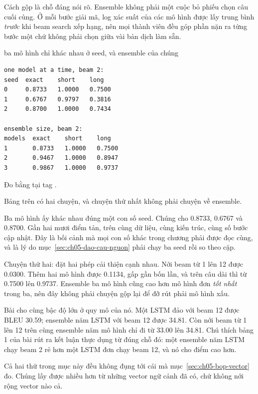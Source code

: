 Cách gộp là chỗ đáng nói rõ. Ensemble không phải một cuộc bỏ phiếu chọn câu cuối
cùng. Ở mỗi bước giải mã, log xác suất của các mô hình được lấy trung bình
\emph{trước} khi beam search xếp hạng, nên mọi thành viên đều góp phần nặn ra
từng bước một chứ không phải chọn giữa vài bản dịch làm sẵn.

\begin{measured}{ba mô hình chỉ khác nhau ở seed, và ensemble của chúng}
\begin{verbatim}
one model at a time, beam 2:
seed  exact    short    long
0     0.8733   1.0000   0.7500
1     0.6767   0.9797   0.3816
2     0.8700   1.0000   0.7434

ensemble size, beam 2:
models  exact    short    long
1       0.8733   1.0000   0.7500
2       0.9467   1.0000   0.8947
3       0.9867   1.0000   0.9737
\end{verbatim}

Đo bằng  tại tag .
\end{measured}

%
Bảng trên có hai chuyện, và chuyện thứ nhất không phải chuyện về ensemble.

Ba mô hình ấy khác nhau đúng một con số seed. Chúng cho 0.8733, 0.6767 và
0.8700. Gần hai mươi điểm tản, trên cùng dữ liệu, cùng kiến trúc, cùng số bước
cập nhật. Đây là bối cảnh mà mọi con số khác trong chương phải được đọc cùng, và
là lý do mục~\ref{sec:ch05-dao-cau-nguon} phải chạy ba seed rồi so theo cặp.

Chuyện thứ hai: đặt hai phép cải thiện cạnh nhau. Nới beam từ 1 lên 12 được
0.0300. Thêm hai mô hình được 0.1134, gấp gần bốn lần, và trên câu dài thì từ
0.7500 lên 0.9737. Ensemble ba mô hình cũng cao hơn mô hình đơn \emph{tốt nhất}
trong ba, nên đây không phải chuyện gộp lại để đỡ rút phải mô hình xấu.

Bài cho cùng bậc độ lớn ở quy mô của nó. Một LSTM đảo với beam 12 được BLEU
30.59; ensemble năm LSTM với beam 12 được 34.81. Còn nới beam từ 1 lên 12 trên
cùng ensemble năm mô hình chỉ đi từ 33.00 lên 34.81. Chú thích bảng 1 của bài
rút ra kết luận thực dụng từ đúng chỗ đó: một ensemble năm LSTM chạy beam 2 rẻ
hơn một LSTM đơn chạy beam 12, và nó cho điểm cao hơn.

Cả hai thứ trong mục này đều không đụng tới cái mà
mục~\ref{sec:ch05-bop-vector} đo. Chúng lấy được nhiều hơn từ những vector ngữ
cảnh đã có, chứ không nới rộng vector nào cả.
